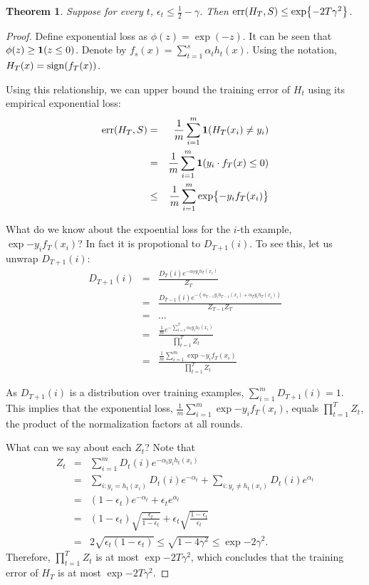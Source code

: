 \documentclass{article}
\newtheorem{theorem}{Theorem}
\DeclareMathOperator*{\err}{{\rm err}}
\DeclareMathOperator*{\sign}{{\rm sign}}
\newcommand*{\one}{{\bf 1}}
\begin{document}
\begin{theorem}
Suppose for every $t$, $\epsilon_t \leq \frac12 - \gamma$. Then
$\err(H_T, S) \leq \exp{-2 T \gamma^2}$.
\end{theorem}
\begin{proof}
Define exponential loss as $\phi(z) = \exp(-z)$. It can be seen that
$\phi(z) \geq \one(z \leq 0)$. Denote by $f_s(x) = \sum_{t=1}^s \alpha_t h_t(x)$.
Using the notation, $H_T(x) = \sign(f_T(x))$.

Using this relationship, we can upper bound the training error of $H_t$ using
its empirical exponential loss:
\begin{eqnarray*}
  \err(H_T, S) &=& \frac1m \sum_{i=1}^m \one(H_T(x_i) \neq y_i) \\
               &=& \frac1m \sum_{i=1}^m \one(y_i \cdot f_T(x) \leq 0) \\
               &\leq& \frac1m \sum_{i=1}^m \exp{ - y_i f_T(x_i) }
\end{eqnarray*}

What do we know about the expoential loss for the $i$-th example, $\exp{ - y_i f_T(x_i) }$?
In fact it is propotional to $D_{T+1}(i)$. To see this, let us unwrap $D_{T+1}(i)$:
\begin{eqnarray*}
   D_{T+1}(i)
   &=& \frac{D_T(i) e^{-\alpha_T y_i h_T(x_i)}}{Z_T} \\
   &=& \frac{D_{T-1}(i) e^{-(\alpha_{T-1} y_i h_{T-1}(x_i) + \alpha_T y_i  h_T(x_i))}}{Z_{T-1} Z_T} \\
   &=& \ldots \\
   &=& \frac{\frac1m e^{-\sum_{t=1}^T \alpha_t y_i h_t(x_i)}}{\prod_{t=1}^T Z_t} \\
   &=& \frac{\frac1m \sum_{i=1}^m \exp{ - y_i f_T(x_i) }}{\prod_{t=1}^T Z_t}
\end{eqnarray*}

As $D_{T+1}(i)$ is a distribution over training examples, $\sum_{i=1}^m D_{T+1}(i) = 1$. This implies that the exponential loss, $\frac1m \sum_{i=1}^m \exp{ - y_i f_T(x_i) }$, equals $\prod_{t=1}^T Z_t$, the product of the normalization factors at all rounds.

What can we say about each $Z_t$? Note that
\begin{eqnarray*}
  Z_t &=& \sum_{i=1}^m D_t(i) e^{-\alpha_t y_i h_t(x_i)} \\
      &=& \sum_{i: y_i = h_t(x_i)} D_t(i) e^{-\alpha_t} + \sum_{i: y_i \neq h_t(x_i)} D_t(i) e^{\alpha_t} \\
      &=& (1-\epsilon_t) e^{-\alpha_t} + \epsilon_t e^{\alpha_t} \\
      &=& (1-\epsilon_t) \sqrt{\frac{\epsilon_t}{1-\epsilon_t}} + \epsilon_t  \sqrt{\frac{1-\epsilon_t}{\epsilon_t}}\\
      &=& 2\sqrt{\epsilon_t(1-\epsilon_t)} \leq \sqrt{1-4\gamma^2} \leq \exp{-2\gamma^2}.
\end{eqnarray*}
Therefore, $\prod_{t=1}^T Z_t$ is at most $\exp{-2T\gamma^2}$, which concludes that the training error of $H_T$ is at most $\exp{-2T\gamma^2}$.

\end{proof}
\end{document}
